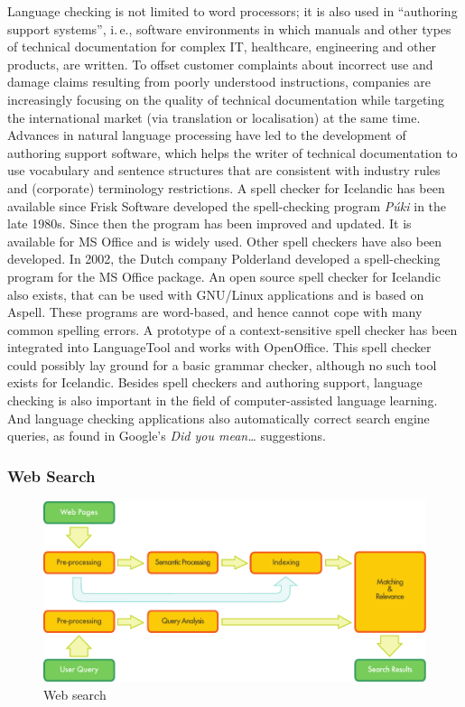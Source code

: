 \documentclass{../../metanetpaper}
\begin{document}
\begin{multicols}{2}
Language checking is not limited to word processors; it is also used in “authoring support systems”, i.\,e., software environments in which manuals and other types of technical documentation for complex IT, healthcare, engineering and other products, are written. To offset customer complaints about incorrect use and damage claims resulting from poorly understood instructions, companies are increasingly focusing on the quality of technical documentation while targeting the international market (via translation or localisation) at the same time. Advances in natural language processing have led to the development of authoring support software, which helps the writer of technical documentation to use vocabulary and sentence structures that are consistent with industry rules and (corporate) terminology restrictions.
A spell checker for Icelandic has been available since Frisk Software developed the spell-checking program \textit{Púki} in the late 1980s. Since then the program has been improved and updated. It is available for MS Office and is widely used. Other spell checkers have also been developed. In 2002, the Dutch company Polderland developed a spell-checking program for the MS Office package. An open source spell checker for Icelandic also exists, that can be used with GNU/Linux applications and is based on Aspell. These programs are word-based, and hence cannot cope with many common spelling errors. A prototype of a context-sensitive spell checker has been integrated into LanguageTool\cite{lto1} and works with OpenOffice. This spell checker could possibly lay ground for a basic grammar checker, although no such tool exists for Icelandic.
Besides spell checkers and authoring support, language checking is also important in the field of computer-assisted language learning. And language checking applications also automatically correct search engine queries, as found in Google's \textit{Did you mean…} suggestions.

\subsubsection{Web Search}

\begin{figure}[htb]
  \center
  \includegraphics[width=\textwidth]{../_media/english/web_search_architecture}
  \caption{Web search}
  \label{fig:websearcharch_en}
 \end{figure}


\end{multicols}
\end{document}
